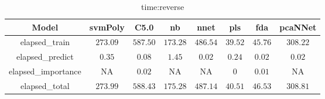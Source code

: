 \begin{table}[!ht]
	\centering
	\begin{tabular}{|c|c|c|c|c|c|c|c|}
		\hline
		Model & svmPoly & C5.0 & nb & nnet & pls & fda & pcaNNet \\ \hline
		elapsed_train & $273.09$ & $587.50$ & $173.28$ & $486.54$ & $39.52$ & $45.76$ & $308.22$ \\ \hline
		elapsed_predict & $0.35$ & $0.08$ & $1.45$ & $0.02$ & $0.24$ & $0.02$ & $0.02$ \\ \hline
		elapsed_importance & NA & $0.02$ & NA & NA & $0$ & $0.01$ & NA \\ \hline
		elapsed_total & $273.99$ & $588.43$ & $175.28$ & $487.14$ & $40.51$ & $46.53$ & $308.81$ \\ \hline
	\end{tabular}
	\caption{time:reverse}
	\label{tab:time:reverse}
\end{table}
